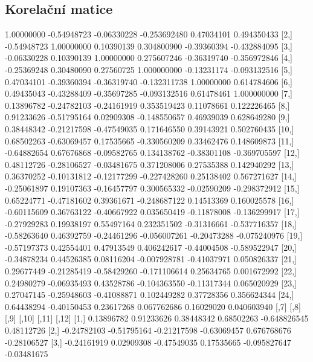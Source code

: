 \documentclass[a4paper, 12pt]{article}
\begin{document}
\subsection{Korelační matice}
\begin{Schunk}
\begin{Soutput}
             [,1]        [,2]        [,3]         [,4]        [,5]         [,6]
 [1,]  1.00000000 -0.54948723 -0.06330228 -0.253692480  0.47034101  0.494350433
 [2,] -0.54948723  1.00000000  0.10390139  0.304800900 -0.39360394 -0.432884095
 [3,] -0.06330228  0.10390139  1.00000000  0.275607246 -0.36319740 -0.356972846
 [4,] -0.25369248  0.30480090  0.27560725  1.000000000 -0.13231174 -0.093132516
 [5,]  0.47034101 -0.39360394 -0.36319740 -0.132311738  1.00000000  0.614784606
 [6,]  0.49435043 -0.43288409 -0.35697285 -0.093132516  0.61478461  1.000000000
 [7,]  0.13896782 -0.24782103 -0.24161919  0.353519423  0.11078661  0.122226465
 [8,]  0.91233626 -0.51795164  0.02909308 -0.148550657  0.46939039  0.628649280
 [9,]  0.38448342 -0.21217598 -0.47549035  0.171646550  0.39143921  0.502760435
[10,]  0.68502263 -0.63069457  0.17535665 -0.330560209  0.33462476  0.148609873
[11,] -0.64882654  0.67676868 -0.09582765  0.134138762 -0.38301108 -0.369705597
[12,]  0.48112726 -0.28106527 -0.03481675  0.371208006  0.27535388  0.142940292
[13,]  0.36370252 -0.10131812 -0.12177299 -0.227428260  0.25138402  0.567271627
[14,] -0.25061897  0.19107363 -0.16457797  0.300565332 -0.02590209 -0.298372912
[15,]  0.65224771 -0.47181602  0.39361671 -0.248687122  0.14513369  0.160025578
[16,] -0.60115609  0.36763122 -0.40667922  0.035650419 -0.11878008 -0.136299917
[17,] -0.27929283  0.19938197  0.55497164  0.232351502 -0.31316661 -0.537716357
[18,] -0.58263640  0.46392759 -0.24461296 -0.056007261 -0.20473288 -0.075240976
[19,] -0.57197373  0.42554401  0.47913549  0.406242617 -0.44004508 -0.589522947
[20,] -0.34878234  0.44526385  0.08116204 -0.007928781 -0.41037971  0.050826337
[21,]  0.29677449 -0.21285419 -0.58429260 -0.171106614  0.25634765  0.001672992
[22,]  0.24980279 -0.06935493  0.43528786 -0.104363550 -0.11317344  0.065020929
[23,]  0.27047145 -0.25948603 -0.41088871  0.102449282  0.37728356  0.356624344
[24,]  0.64438294 -0.40150453  0.23617268  0.067762686  0.16029020  0.040603940
             [,7]        [,8]        [,9]       [,10]        [,11]       [,12]
 [1,]  0.13896782  0.91233626  0.38448342  0.68502263 -0.648826545  0.48112726
 [2,] -0.24782103 -0.51795164 -0.21217598 -0.63069457  0.676768676 -0.28106527
 [3,] -0.24161919  0.02909308 -0.47549035  0.17535665 -0.095827647 -0.03481675

\end{Soutput}
\end{Schunk}
\end{document}
